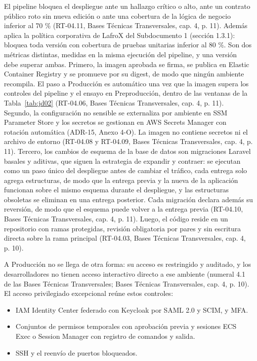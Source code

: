 El pipeline bloquea el despliegue ante un hallazgo crítico o alto, ante un contrato público roto sin nueva edición o ante una cobertura de la lógica de negocio inferior al 70 \% (RT-04.11, Bases Técnicas Transversales, cap. 4, p. 11). Además aplica la política corporativa de LafroX del Subdocumento 1 (sección 1.3.1): bloquea toda versión con cobertura de pruebas unitarias inferior al 80 \%. Son dos métricas distintas, medidas en la misma ejecución del pipeline, y una versión debe superar ambas. Primero, la imagen aprobada se firma, se publica en Elastic Container Registry y se promueve por su digest, de modo que ningún ambiente recompila. El paso a Producción es automático una vez que la imagen supera los controles del pipeline y el ensayo en Preproducción, dentro de las ventanas de la Tabla~\ref{tab:jd02} (RT-04.06, Bases Técnicas Transversales, cap. 4, p. 11). Segundo, la configuración no sensible se externaliza por ambiente en SSM Parameter Store y los secretos se gestionan en AWS Secrets Manager con rotación automática (ADR-15, Anexo 4-O). La imagen no contiene secretos ni el archivo de entorno (RT-04.08 y RT-04.09, Bases Técnicas Transversales, cap. 4, p. 11). Tercero, los cambios de esquema de la base de datos son migraciones Laravel basales y aditivas, que siguen la estrategia de expandir y contraer: se ejecutan como un paso único del despliegue antes de cambiar el tráfico, cada entrega solo agrega estructuras, de modo que la entrega previa y la nueva de la aplicación funcionan sobre el mismo esquema durante el despliegue, y las estructuras obsoletas se eliminan en una entrega posterior. Cada migración declara además su reversión, de modo que el esquema puede volver a la entrega previa (RT-04.10, Bases Técnicas Transversales, cap. 4, p. 11). Luego, el código reside en un repositorio con ramas protegidas, revisión obligatoria por pares y sin escritura directa sobre la rama principal (RT-04.03, Bases Técnicas Transversales, cap. 4, p. 10).

A Producción no se llega de otra forma: su acceso es restringido y auditado, y los desarrolladores no tienen acceso interactivo directo a ese ambiente (numeral 4.1 de las Bases Técnicas Transversales; Bases Técnicas Transversales, cap. 4, p. 10). El acceso privilegiado excepcional reúne estos controles:

\begin{itemize}
  \item IAM Identity Center federado con Keycloak por SAML 2.0 y SCIM, y MFA.
  \item Conjuntos de permisos temporales con aprobación previa y sesiones ECS Exec o Session Manager con registro de comandos y salida.
  \item SSH y el reenvío de puertos bloqueados.
\end{itemize}

